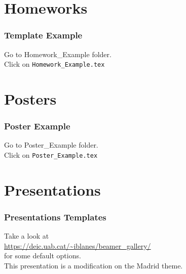 \documentclass[serif,12pt, aspectratio=169]{beamer}
\begin{document}
\section{Homeworks}
\begin{frame}
	\frametitle{Template Example}
	\centering
	{\Large Go to Homework\_Example folder. \\ Click on \texttt{Homework\_Example.tex}}
\end{frame}


\section{Posters}
\begin{frame}
	\frametitle{Poster Example}
	\centering
	{\Large Go to Poster\_Example folder. \\ Click on \texttt{Poster\_Example.tex}}
\end{frame}



\section{Presentations}
\begin{frame}
	\frametitle{Presentations Templates}
	Take a look at  \\ \url{https://deic.uab.cat/~iblanes/beamer_gallery/} \\
	for some default options. 
	\pause
	\\
	This presentation is a modification on the Madrid theme. 
\end{frame}
\end{document}

